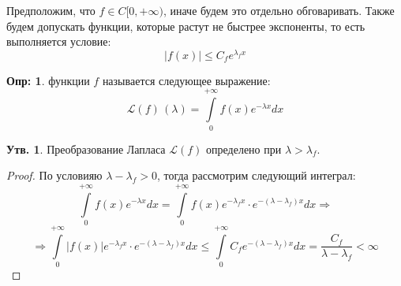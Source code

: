 \documentclass[12pt]{article}
\newcommand{\ML}{\mathcal{L}}
\theoremstyle{definition}
\newtheorem{defn}{Опр:}
\newtheorem{prop}{Утв.}
\newcommand{\ddint}[2]{\displaystyle\int\limits_{#1}^{#2}}
\begin{document}
Предположим, что $f \in C[0, +\infty)$, иначе будем это отдельно обговаривать. Также будем допускать функции, которые растут не быстрее экспоненты, то есть выполняется условие: 
$$
	|f(x)| \leq C_f e^{\lambda_f x}
$$
\begin{defn}
	 функции $f$ называется следующее выражение:
	$$
		\ML(f)\,(\lambda) = \ddint{0}{+\infty}f(x)e^{-\lambda x}dx
	$$
\end{defn}

\begin{prop}
	Преобразование Лапласа $\ML(f)$ определено при $\lambda > \lambda_f$.
\end{prop}
\begin{proof}
	По условияю $\lambda - \lambda_f >0$, тогда рассмотрим следующий интеграл:
	$$
		\ddint{0}{+\infty}f(x)e^{-\lambda x}dx = \ddint{0}{+\infty}f(x)e^{-\lambda_f x}{\cdot}e^{-(\lambda - \lambda_f)x}dx \Rightarrow
	$$
	$$
		\Rightarrow \ddint{0}{+\infty}\left|f(x)\right|e^{-\lambda_f x}{\cdot}e^{-(\lambda - \lambda_f)x}dx \leq \ddint{0}{+\infty}C_f e^{-(\lambda - \lambda_f)x}dx = \dfrac{C_f}{\lambda - \lambda_f} < \infty
	$$
\end{proof}
\end{document}
